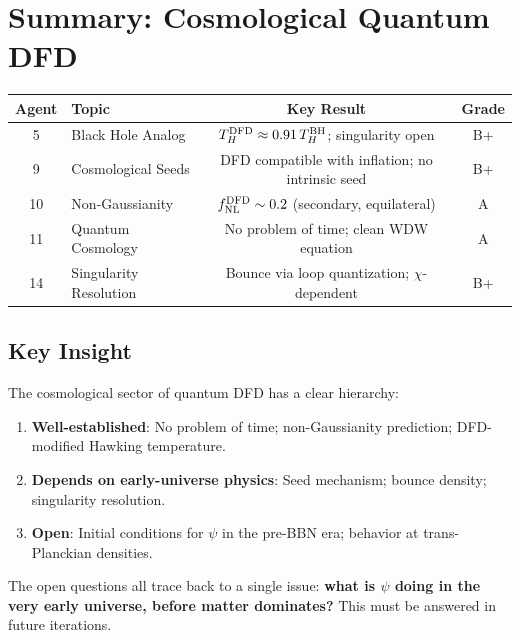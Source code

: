 \documentclass[11pt,a4paper]{article}
\begin{document}
\newpage

\section{Summary: Cosmological Quantum DFD}
\label{sec:cosmo-summary}

\begin{center}
\begin{tabular}{clcc}
\toprule
\textbf{Agent} & \textbf{Topic} & \textbf{Key Result} & \textbf{Grade} \\
\midrule
5 & Black Hole Analog & $T_H^{\rm DFD} \approx 0.91\,T_H^{\rm BH}$; singularity open & B+ \\
9 & Cosmological Seeds & DFD compatible with inflation; no intrinsic seed & B+ \\
10 & Non-Gaussianity & $f_{\rm NL}^{\rm DFD} \sim 0.2$ (secondary, equilateral) & A \\
11 & Quantum Cosmology & No problem of time; clean WDW equation & A \\
14 & Singularity Resolution & Bounce via loop quantization; $\chi$-dependent & B+ \\
\bottomrule
\end{tabular}
\end{center}

\subsection{Key Insight}

The cosmological sector of quantum DFD has a clear hierarchy:
\begin{enumerate}
\item \textbf{Well-established}: No problem of time; non-Gaussianity prediction; DFD-modified Hawking temperature.
\item \textbf{Depends on early-universe physics}: Seed mechanism; bounce density; singularity resolution.
\item \textbf{Open}: Initial conditions for $\psi$ in the pre-BBN era; behavior at trans-Planckian densities.
\end{enumerate}

The open questions all trace back to a single issue: \textbf{what is $\psi$ doing in the very early universe, before matter dominates?} This must be answered in future iterations.
\end{document}
